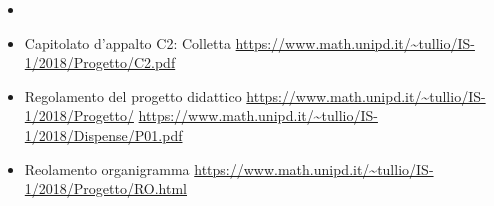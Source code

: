 \begin{itemize}
    \item \NdP
    \item Capitolato d'appalto C2: Colletta \newline \url{https://www.math.unipd.it/~tullio/IS-1/2018/Progetto/C2.pdf}
    \item Regolamento del progetto didattico 
    \newline \url{https://www.math.unipd.it/~tullio/IS-1/2018/Progetto/}
    \newline \url{https://www.math.unipd.it/~tullio/IS-1/2018/Dispense/P01.pdf}
    \item Reolamento organigramma \newline \url{https://www.math.unipd.it/~tullio/IS-1/2018/Progetto/RO.html}
\end{itemize}